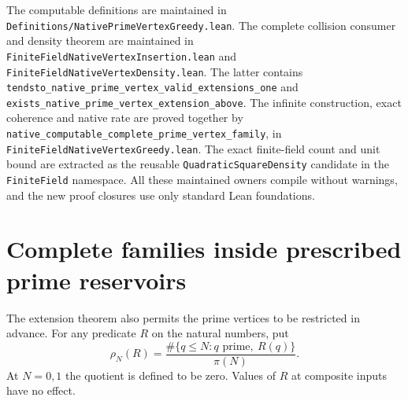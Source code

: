 \documentclass[11pt]{article}
\begin{document}
The computable definitions are maintained in
\texttt{Definitions/NativePrimeVertexGreedy.lean}. The complete
collision consumer and density theorem are maintained in
\texttt{FiniteFieldNativeVertexInsertion.lean} and
\texttt{FiniteFieldNativeVertexDensity.lean}. The latter contains
\texttt{tendsto\_native\_prime\_vertex\_valid\_extensions\_one}
and \texttt{exists\_native\_prime\_vertex\_extension\_above}.
The infinite construction, exact coherence and native rate are
proved together by
\texttt{native\_computable\_complete\_prime\_vertex\_family},
in \texttt{FiniteFieldNativeVertexGreedy.lean}.
The exact finite-field count and unit bound are extracted as the
reusable \texttt{QuadraticSquareDensity} candidate in the
\texttt{FiniteField} namespace.
All these maintained owners compile without warnings, and the new
proof closures use only standard Lean foundations.

\section{Complete families inside prescribed prime reservoirs}
\label{sec:native-prime-reservoirs}
The extension theorem also permits the prime vertices to be restricted
in advance. For any predicate \(R\) on the natural numbers, put
\[
 \rho_N(R)=
 \frac{\#\{q\le N:q\text{ prime},\ R(q)\}}{\pi(N)}.
\]
At \(N=0,1\) the quotient is defined to be zero. Values of \(R\)
at composite inputs have no effect.
\end{document}
